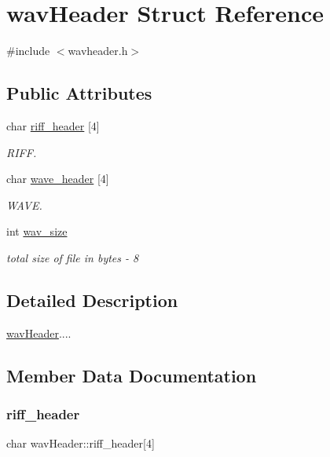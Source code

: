 \hypertarget{structwavHeader}{}\section{wav\+Header Struct Reference}
\label{structwavHeader}


{\ttfamily \#include $<$wavheader.\+h$>$}

\subsection*{Public Attributes}
\begin{DoxyCompactItemize}
\item 
char \hyperlink{structwavHeader_aa001e48dfa6193b32562533ad119c60d}{riff\+\_\+header} \mbox{[}4\mbox{]}
\begin{DoxyCompactList}\small\item\em R\+I\+FF. \end{DoxyCompactList}\item 
char \hyperlink{structwavHeader_ae9a0bfdec6e8b7ba48dd27d7ac587f62}{wave\+\_\+header} \mbox{[}4\mbox{]}
\begin{DoxyCompactList}\small\item\em W\+A\+VE. \end{DoxyCompactList}\item 
int \hyperlink{structwavHeader_adf513d299b6989b3046347077e077c82}{wav\+\_\+size}
\begin{DoxyCompactList}\small\item\em total size of file in bytes -\/ 8 \end{DoxyCompactList}\end{DoxyCompactItemize}


\subsection{Detailed Description}
\hyperlink{structwavHeader}{wav\+Header}.... 

\subsection{Member Data Documentation}
\mbox{\label{structwavHeader_aa001e48dfa6193b32562533ad119c60d}} 
\subsubsection{\texorpdfstring{riff\+\_\+header}{riff\_header}}
{\footnotesize\ttfamily char wav\+Header\+::riff\+\_\+header\mbox{[}4\mbox{]}}



